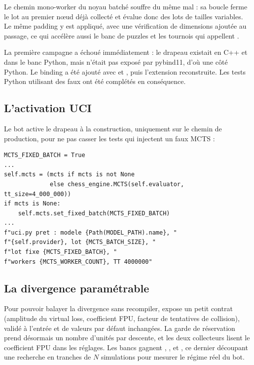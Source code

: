 Le chemin mono-worker du noyau batch\'e souffre du m\^eme mal : sa boucle
ferme le lot au premier n\oe{}ud d\'ej\`a collect\'e et \'evalue donc des lots
de tailles variables. Le m\^eme padding y est appliqu\'e, avec une v\'erification
de dimensions ajout\'ee au passage, ce qui acc\'el\`ere aussi le banc de puzzles
et les tournois qui appellent .

\begin{piege}
La premi\`ere campagne  a \'echou\'e imm\'ediatement : le
drapeau existait en C++ et dans le banc Python, mais 
n'\'etait pas expos\'e par pybind11, d'o\`u une  c\^ot\'e
Python. Le binding a \'et\'e ajout\'e avec  et
, puis l'extension reconstruite. Les tests Python utilisant
des faux  ont \'et\'e compl\'et\'es en cons\'equence.
\end{piege}

\subsection{L'activation UCI}

Le bot active le drapeau \`a la construction, uniquement sur le chemin de
production, pour ne pas casser les tests qui injectent un faux MCTS :

\begin{lstlisting}[caption={\code{uci.py} : activation et journal.}]
MCTS_FIXED_BATCH = True
...
self.mcts = (mcts if mcts is not None
             else chess_engine.MCTS(self.evaluator, tt_size=4_000_000))
if mcts is None:
    self.mcts.set_fixed_batch(MCTS_FIXED_BATCH)
...
f"uci.py pret : modele {Path(MODEL_PATH).name}, "
f"{self.provider}, lot {MCTS_BATCH_SIZE}, "
f"lot fixe {MCTS_FIXED_BATCH}, "
f"workers {MCTS_WORKER_COUNT}, TT 4000000"
\end{lstlisting}

\subsection{La divergence param\'etrable}

Pour pouvoir balayer la divergence sans recompiler,  expose un
petit contrat  (amplitude du virtual loss, coefficient FPU,
facteur de tentatives de collision), valid\'e \`a l'entr\'ee et de valeurs par
d\'efaut inchang\'ees. La garde de r\'eservation prend d\'esormais un nombre
d'unit\'es par descente, et les deux collecteurs lisent le coefficient FPU
dans les r\'eglages. Les bancs gagnent , ,
 et , ce dernier d\'ecoupant une
recherche en tranches de $N$ simulations pour mesurer le r\'egime r\'eel du
bot.


